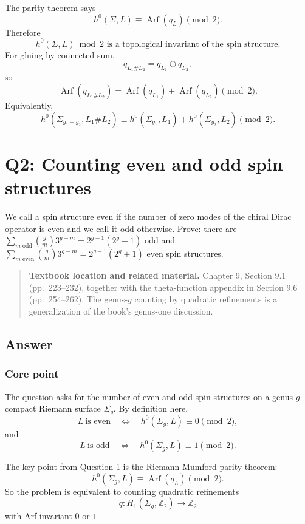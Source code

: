 \documentclass[
  10pt,
  a4paper,
  openany]{book}
\begin{document}
The parity theorem says \[
h^0(\Sigma,L)
\equiv
\operatorname{Arf}(q_L)
\pmod 2.
\] Therefore \[
\boxed{
h^0(\Sigma,L)\bmod 2
\text{ is a topological invariant of the spin structure.}
}
\] For gluing by connected sum, \[
q_{L_1\# L_2}=q_{L_1}\oplus q_{L_2},
\] so \[
\operatorname{Arf}(q_{L_1\# L_2})
=
\operatorname{Arf}(q_{L_1})
+
\operatorname{Arf}(q_{L_2})
\pmod 2.
\] Equivalently, \[
\boxed{
h^0(\Sigma_{g_1+g_2},L_1\# L_2)
\equiv
h^0(\Sigma_{g_1},L_1)
+
h^0(\Sigma_{g_2},L_2)
\pmod 2.
}
\]

\section{Q2: Counting even and odd spin
structures}\label{q2-counting-even-and-odd-spin-structures}

We call a spin structure even if the number of zero modes of the chiral
Dirac operator is even and we call it odd otherwise. Prove: there are
\(\sum_{m\text{ odd}}\binom{g}{m}3^{g-m}=2^{g-1}(2^g-1)\) odd and
\(\sum_{m\text{ even}}\binom{g}{m}3^{g-m}=2^{g-1}(2^g+1)\) even spin
structures.

\begin{quote}
\textbf{Textbook location and related material.} Chapter 9, Section 9.1
(pp.~223--232), together with the theta-function appendix in Section 9.6
(pp.~254--262). The genus-\(g\) counting by quadratic refinements is a
generalization of the book's genus-one discussion.
\end{quote}

\subsection{Answer}\label{answer-5}

\subsubsection{Core point}\label{core-point-5}

The question asks for the number of even and odd spin structures on a
genus-\(g\) compact Riemann surface \(\Sigma_g\). By definition here, \[
L\ \text{is even}
\quad\Longleftrightarrow\quad
h^0(\Sigma_g,L)\equiv 0\pmod 2,
\] and \[
L\ \text{is odd}
\quad\Longleftrightarrow\quad
h^0(\Sigma_g,L)\equiv 1\pmod 2.
\]

The key point from Question 1 is the Riemann-Mumford parity theorem: \[
h^0(\Sigma_g,L)
\equiv
\operatorname{Arf}(q_L)
\pmod 2.
\] So the problem is equivalent to counting quadratic refinements \[
q:H_1(\Sigma_g,\mathbb Z_2)\to\mathbb Z_2
\] with Arf invariant \(0\) or \(1\).
\end{document}
